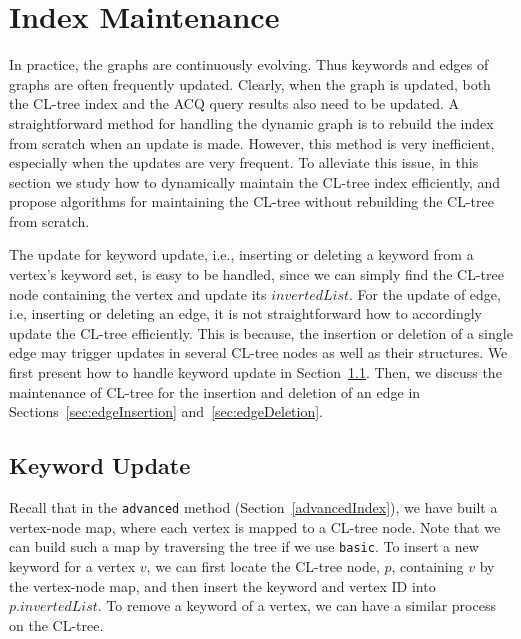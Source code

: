 {\color{blue}
\section{Index Maintenance}
\label{indexMaintenance}

In practice, the graphs are continuously evolving. Thus keywords and edges of graphs are often frequently updated.
Clearly, when the graph is updated, both the CL-tree index and the ACQ query results also need to be updated.
A straightforward method for handling the dynamic graph is to rebuild the index from scratch when an update is made.
However, this method is very inefficient, especially when the updates are very frequent.
To alleviate this issue, in this section we study how to dynamically maintain the CL-tree index efficiently,
and propose algorithms for maintaining the CL-tree without rebuilding the CL-tree from scratch.

The update for keyword update, i.e., inserting or deleting a keyword from a vertex's keyword set, is easy to be handled, since we can simply find the CL-tree node containing the vertex and update its $invertedList$.
For the update of edge, i.e, inserting or deleting an edge, it is not straightforward how to accordingly update the CL-tree efficiently. This is because, the insertion or deletion of a single edge may trigger updates in several CL-tree nodes as well as their structures.
We first present how to handle keyword update in Section~\ref{sec:keyword}.
Then, we discuss the maintenance of CL-tree for the insertion and deletion of an edge in Sections~\ref{sec:edgeInsertion} and~\ref{sec:edgeDeletion}.

\subsection{Keyword Update}
\label{sec:keyword}
Recall that in the {\tt advanced} method (Section~\ref{advancedIndex}), we have built a vertex-node map, where each vertex is mapped to a CL-tree node. Note that we can build such a map by traversing the tree if we use {\tt basic}.
To insert a new keyword for a vertex $v$, we can first locate the CL-tree node, $p$, containing $v$ by the vertex-node map, and then insert the keyword and vertex ID into $p.invertedList$. To remove a keyword of a vertex, we can have a similar process on the CL-tree.




} 